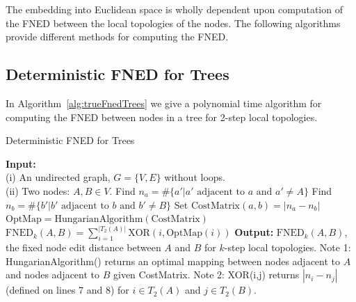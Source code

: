 \documentclass[10pt,twocolumn,fleqn]{article}
\begin{document}
The embedding into Euclidean space is wholly dependent upon computation of the FNED between the local topologies of the nodes. The following algorithms provide different methods for computing the FNED.


\subsection{Deterministic FNED for Trees}

In Algorithm~\ref{alg:trueFnedTrees} we give a polynomial time algorithm for computing the FNED between nodes in a tree for 2-step local topologies.
\begin{algorithm}[!]
\caption{Deterministic FNED for Trees}
\label{alg:trueFnedTrees}
\begin{algorithmic}[1]
\STATE \textbf{Input:} \\(i) An undirected graph, $G = \{V,E\}$ without loops.\\(ii) Two nodes: $A, B \in V$.
\STATE Find $n_{a} = \# \{ a' | a' \text{ adjacent to } a \text{ and } a' \neq A \}$
\STATE Find $n_{b} = \# \{ b' | b' \text{ adjacent to } b \text{ and } b' \neq B \}$
\STATE Set $\text{CostMatrix}(a,b) = | n_{a} - n_{b} |$
\ENDFOR
\ENDFOR
\STATE $\text{OptMap}=\text{HungarianAlgorithm}(\text{CostMatrix})$
\STATE $\text{FNED}_{k}(A,B) = \sum_{i=1}^{|T_{2}(A)|} \text{XOR}(i,\text{OptMap}(i))$
\STATE \textbf{Output:} $\text{FNED}_{k}(A,B)$, the fixed node edit distance between $A$ and $B$ for $k$-step local topologies.
\STATE Note 1: HungarianAlgorithm() returns an optimal mapping between nodes adjacent to $A$ and nodes adjacent to $B$ given CostMatrix.
\STATE Note 2: XOR(i,j) returns $|n_{i} - n_{j}|$ (defined on lines 7 and 8) for $i \in T_{2}(A)$ and $j \in T_{2}(B)$.
\end{algorithmic}
\end{algorithm}
\end{document}
